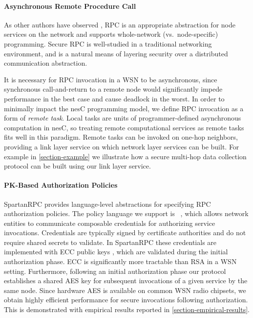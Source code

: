 \paragraph{Asynchronous Remote Procedure Call}  As other authors 
have observed \cite{may-tinyrpc-2007}, RPC is an appropriate
abstraction for node services on the network and supports
whole-network (vs.~node-specific) programming. Secure RPC is
well-studied in a traditional networking environment, and is a natural
means of layering security over a distributed communication
abstraction. 

It is necessary for RPC invocation in a WSN to be asynchronous, since
synchronous call-and-return to a remote node would significantly
impede performance in the best case and cause deadlock in the worst.
In order to minimally impact the nesC programming model, we define RPC
invocation as a form of \emph{remote task}. Local tasks are units of
programmer-defined asynchronous computation in nesC, so treating
remote computational services as remote tasks fits well in this
paradigm. Remote tasks can be invoked on one-hop neighbors, providing
a link layer service on which network layer services can be built. For
example in \autoref{section-example} we illustrate how a secure
multi-hop data collection protocol can be built using our link layer
service.

\paragraph{PK-Based Authorization Policies} SpartanRPC provides language-level
abstractions for specifying RPC authorization policies. The policy
language we support is \RT\ \cite{Li:DRBTMF}, which allows network
entities to communicate composable credentials for authorizing service
invocations. Credentials are typically signed by certificate
authorities and do not require shared secrets to validate.  In
SpartanRPC these credentials are implemented with ECC public keys
\cite{bertoni-2006}, which are validated during the initial
authorization phase. ECC is significantly more tractable than RSA in a
WSN setting. Furthermore, following an initial authorization phase
our protocol establishes a shared AES key for subsequent invocations
of a given service by the same node. Since hardware AES is available
on common WSN radio chipsets, we obtain highly efficient performance
for secure invocations following authorization. This is demonstrated
with empirical results reported in
\autoref{section-empirical-results}.

